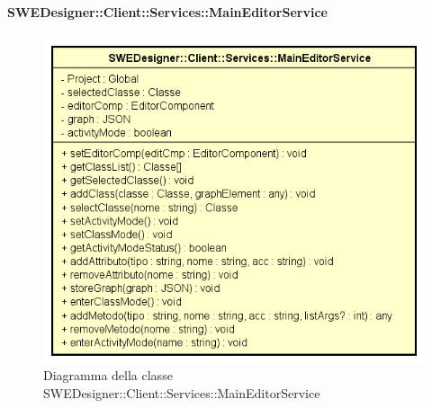           	\paragraph{SWEDesigner::Client::Services::MainEditorService}
          	\begin{figure}[h!]
			\centering
			\includegraphics[scale=0.8]{Classi/SWEDesigner__Client__Services__MainEditorService.png}
			\caption{Diagramma della classe SWEDesigner::Client::Services::MainEditorService}
 			\end{figure}
